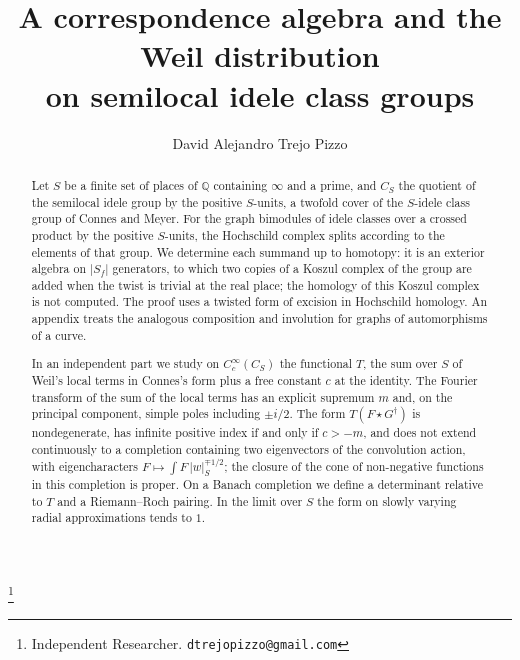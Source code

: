 \documentclass[11pt]{amsart}
\theoremstyle{definition}
\theoremstyle{remark}
\newcommand{\Q}{\mathbb Q}
\begin{document}
\title[A correspondence algebra and the Weil distribution]
{A correspondence algebra and the Weil distribution\\ on semilocal idele
class groups}

\author{David Alejandro Trejo Pizzo}
\thanks{Independent Researcher. \texttt{dtrejopizzo@gmail.com}}


\begin{abstract}
Let $S$ be a finite set of places of $\Q$ containing $\infty$ and a prime,
and $C_S$ the quotient of the semilocal idele group by the positive
$S$-units, a twofold cover of the $S$-idele class group of Connes and Meyer.
For the graph bimodules of idele classes over a crossed product by the
positive $S$-units, the Hochschild complex splits according to the elements
of that group.  We determine each summand up to homotopy: it is an exterior
algebra on $|S_f|$ generators, to which two copies of a Koszul complex of the
group are added when the twist is trivial at the real place; the homology of
this Koszul complex is not computed.  The proof uses a twisted form of
excision in Hochschild homology.  An appendix treats the analogous
composition and involution for graphs of automorphisms of a curve.

In an independent part we study on $C_c^{\infty}(C_S)$ the functional $T$,
the sum over $S$ of Weil's local terms in Connes's form plus a free constant
$c$ at the identity.  The Fourier transform of the sum of the local terms has
an explicit supremum $m$ and, on the principal component, simple poles including $\pm i/2$.  The form
$T(F\star G^{\dagger})$ is nondegenerate, has infinite positive index if and
only if $c>-m$, and does not extend continuously to a completion containing
two eigenvectors of the convolution action, with eigencharacters
$F\mapsto\int F\,|w|_S^{\mp1/2}$; the closure of the cone of non-negative
functions in this completion is proper.  On a Banach completion we define a determinant
relative to $T$ and a Riemann--Roch pairing.  In the limit over $S$ the form
on slowly varying radial approximations tends to $1$.
\end{abstract}

\maketitle
\end{document}
